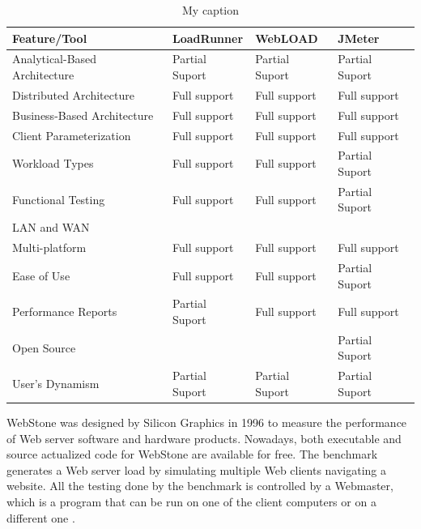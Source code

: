 \documentclass{report}
\begin{document}
\begin{table}[h]
\centering
\caption{My caption}
\label{my-label}
\begin{tabular}{|l|l|l|l|}
\hline
\rowcolor[HTML]{EFEFEF} 
\textbf{Feature/Tool}         & \textbf{LoadRunner} & \textbf{WebLOAD} & \textbf{JMeter} \\ \hline
Analytical-Based Architecture & Partial Suport      & Partial Suport   & Partial Suport  \\ \hline
Distributed Architecture      & Full support        & Full support     & Full support    \\ \hline
Business-Based Architecture   & Full support        & Full support     & Full support    \\ \hline
Client Parameterization       & Full support        & Full support     & Full support    \\ \hline
Workload Types                & Full support        & Full support     & Partial Suport  \\ \hline
Functional Testing            & Full support        & Full support     & Partial Suport  \\ \hline
LAN and WAN                   &                     &                  &                 \\ \hline
Multi-platform                & Full support        & Full support     & Full support    \\ \hline
Ease of Use                   & Full support        & Full support     & Partial Suport  \\ \hline
Performance Reports           & Partial Suport      & Full support     & Full support    \\ \hline
Open Source                   &                     &                  & Partial Suport  \\ \hline
User’s Dynamism               & Partial Suport      & Partial Suport   & Partial Suport  \\ \hline
\end{tabular}
\end{table}

WebStone was designed by Silicon Graphics in 1996 to measure the performance of Web server software and hardware products. Nowadays, both executable and source actualized code for WebStone are available for free. The benchmark generates a Web server load by simulating multiple Web clients navigating a website. All the testing done by the benchmark is controlled by a Webmaster, which is a program that can be run on one of the client computers or on a different one \cite{MohammadS.Obaidat} \cite{Trent1995} . 
\end{document}
